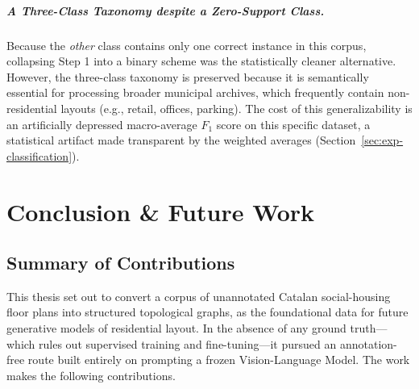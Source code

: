 \documentclass[12pt,a4paper,openright]{report}
\begin{document}
\paragraph{A Three-Class Taxonomy despite a Zero-Support Class.} Because the \textit{other} class contains only one correct instance in this corpus, collapsing Step 1 into a binary scheme was the statistically cleaner alternative. However, the three-class taxonomy is preserved because it is semantically essential for processing broader municipal archives, which frequently contain non-residential layouts (e.g., retail, offices, parking). The cost of this generalizability is an artificially depressed macro-average $F_1$ score on this specific dataset, a statistical artifact made transparent by the weighted averages (Section~\ref{sec:exp-classification}).

\chapter{Conclusion \& Future Work}
\label{ch:conclusion}

\section{Summary of Contributions}

This thesis set out to convert a corpus of unannotated Catalan social-housing floor plans into structured topological graphs, as the foundational data for future generative models of residential layout. In the absence of any ground truth---which rules out supervised training and fine-tuning---it pursued an annotation-free route built entirely on prompting a frozen Vision-Language Model. The work makes the following contributions.
\end{document}
